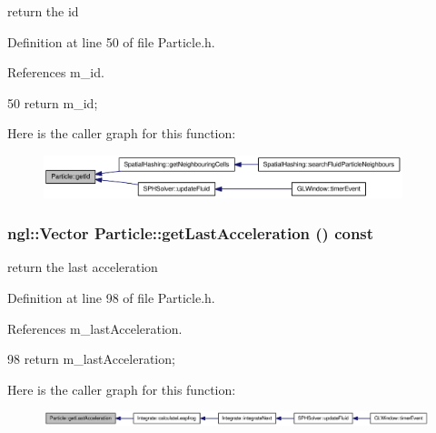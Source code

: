 return the id 



Definition at line 50 of file Particle.h.



References m\_\-id.




\begin{DoxyCode}
50 { return m_id; }
\end{DoxyCode}




Here is the caller graph for this function:\nopagebreak
\begin{figure}[H]
\begin{center}
\leavevmode
\includegraphics[width=296pt]{class_particle_ad9688047786047c9fecf0c304b4f6294_icgraph}
\end{center}
\end{figure}


\hypertarget{class_particle_ab3de889d46b3e95cf91b08674865d128}{
\subsubsection[{getLastAcceleration}]{\setlength{\rightskip}{0pt plus 5cm}ngl::Vector Particle::getLastAcceleration () const}}
\label{class_particle_ab3de889d46b3e95cf91b08674865d128}


return the last acceleration 



Definition at line 98 of file Particle.h.



References m\_\-lastAcceleration.




\begin{DoxyCode}
98 { return m_lastAcceleration; }
\end{DoxyCode}




Here is the caller graph for this function:\nopagebreak
\begin{figure}[H]
\begin{center}
\leavevmode
\includegraphics[width=409pt]{class_particle_ab3de889d46b3e95cf91b08674865d128_icgraph}
\end{center}
\end{figure}


